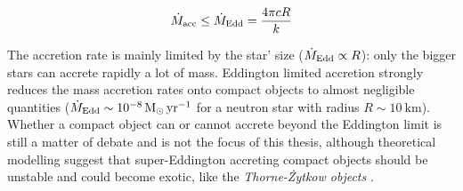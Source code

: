 \documentclass[a4paper,titlepage]{book}     	%
\newcommand{\sun}{\ensuremath{_\odot}}
\newcommand{\mdot}{\ensuremath{\dot{M}}}
\newcommand{\yr}{\text{yr}}
\begin{document}
\begin{equation}\label{eq:Eddingtonaccretion}
\mdot_{\rm acc} \leq \dot{M}_\textup{Edd} = \frac{4 \pi c R}{k}
\end{equation}

The accretion rate is mainly limited by the star' size ($\dot{M}_\textup{Edd} \propto R$): only the bigger stars can accrete rapidly a lot of mass. Eddington limited accretion strongly reduces the mass accretion rates onto compact objects to almost negligible quantities ($\dot{M}_\textup{Edd} \sim\SI{e-8}{M\sun~\yr^{-1}}$ for a neutron star with radius $R\sim\SI{10}{\kilo\metre}$). Whether a compact object can or cannot accrete beyond the Eddington limit is still a matter of debate and is not the focus of this thesis, although theoretical modelling suggest that super-Eddington accreting compact objects should be unstable and could become exotic, like the \emph{Thorne-{\.Z}ytkow objects} \cite{binaries}.
\end{document}
